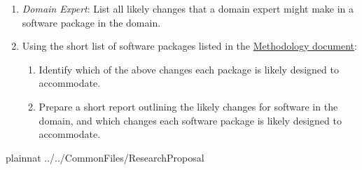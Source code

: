 \documentclass[letterpaper,cleveref]{lipics-v2019}
\theoremstyle{definition}
\begin{document}
\begin{enumerate}
	\item \textit{Domain Expert}: List all likely changes that a domain expert might make in a software package in the domain.
	\item Using the short list of software packages listed in the  \href{https://github.com/smiths/AIMSS/blob/master/StateOfPractice/Methodology/Methodology.pdf}{Methodology document}:
	\begin{enumerate}
		\item Identify which of the above changes each package is likely designed to accommodate.
		\item Prepare a short report outlining the likely changes for software in the domain, and which changes each software package is likely designed to accommodate.
	\end{enumerate}
\end{enumerate}

\newpage

 {plainnat}
 {../../CommonFiles/ResearchProposal}
\end{document}
